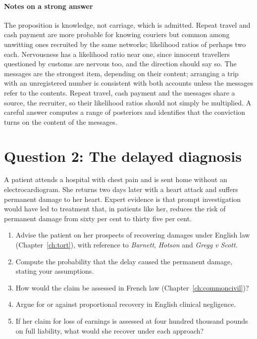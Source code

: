 \paragraph{Notes on a strong answer} The proposition is knowledge, not carriage, which is admitted. Repeat travel and cash payment are more probable for knowing couriers but common among unwitting ones recruited by the same networks; likelihood ratios of perhaps two each. Nervousness has a likelihood ratio near one, since innocent travellers questioned by customs are nervous too, and the direction should say so. The messages are the strongest item, depending on their content; arranging a trip with an unregistered number is consistent with both accounts unless the messages refer to the contents. Repeat travel, cash payment and the messages share a source, the recruiter, so their likelihood ratios should not simply be multiplied. A careful answer computes a range of posteriors and identifies that the conviction turns on the content of the messages.

\section*{Question 2: The delayed diagnosis}
A patient attends a hospital with chest pain and is sent home without an electrocardiogram. She returns two days later with a heart attack and suffers permanent damage to her heart. Expert evidence is that prompt investigation would have led to treatment that, in patients like her, reduces the risk of permanent damage from sixty per cent to thirty five per cent.

\begin{enumerate}[label=(\alph*)]
\item Advise the patient on her prospects of recovering damages under English law (Chapter~\ref{ch:tort}), with reference to \emph{Barnett}, \emph{Hotson} and \emph{Gregg v Scott}.
\item Compute the probability that the delay caused the permanent damage, stating your assumptions.
\item How would the claim be assessed in French law (Chapter~\ref{ch:commoncivil})?
\item Argue for or against proportional recovery in English clinical negligence.
\item If her claim for loss of earnings is assessed at four hundred thousand pounds on full liability, what would she recover under each approach?
\end{enumerate}

